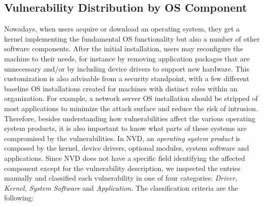 \subsection{Vulnerability Distribution by OS Component}\label{vulntypes}

Nowadays, when users acquire or download an operating system, they get a kernel implementing the fundamental OS functionality but also a number of other software components.  After the initial installation, users may reconfigure the machine to their needs, for instance by removing application packages that are unnecessary and/or by including device drivers to support new hardware. This customization is also advisable from a security standpoint, with a few different baseline OS installations created for machines with distinct roles within an organization. For example, a network server OS installation should be stripped of most applications to minimize the attack surface and reduce the risk of intrusion. Therefore, besides understanding how vulnerabilities affect the various operating system products, it is also important to know what parts of these systems are compromised by the vulnerabilities. In NVD, an \emph{operating system product} is composed by the kernel, device drivers, optional modules, system software and applications. Since NVD does not have a specific field identifying the affected component except for the vulnerability description, we inspected the entries manually and classified each vulnerability in one of four categories: \textit{Driver, Kernel, System Software} and \textit{Application}. %
The classification criteria are the following:

